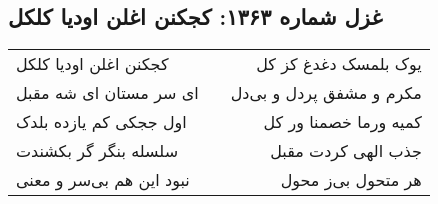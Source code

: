 \begin{center}
\section*{غزل شماره ۱۳۶۳: کجکنن اغلن اودیا کلکل}
\label{sec:1363}
\begin{longtable}{l p{0.5cm} r}
کجکنن اغلن اودیا کلکل
&&
یوک بلمسک دغدغ کز کل
\\
ای سر مستان ای شه مقبل
&&
مکرم و مشفق پردل و بی‌دل
\\
اول ججکی کم یازده بلدک
&&
کمیه ورما خصمنا ور کل
\\
سلسله بنگر گر بکشندت
&&
جذب الهی کردت مقبل
\\
نبود این هم بی‌سر و معنی
&&
هر متحول بی‌ز محول
\\
\end{longtable}
\end{center}
